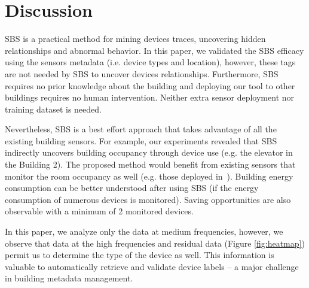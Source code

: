 \section{Discussion}
SBS is a practical method for mining devices traces, uncovering hidden relationships and abnormal behavior. 
In this paper, we validated the SBS efficacy using the sensors metadata (i.e. device types and location), however, these 
tags are not needed by SBS to uncover devices relationships.
Furthermore, SBS requires no prior knowledge about the building and deploying our tool to other buildings requires no human intervention.
Neither extra sensor deployment nor training dataset is needed. 

Nevertheless, SBS is a best effort approach that takes advantage of all the existing building sensors.
For example, our experiments revealed that SBS indirectly uncovers building occupancy through device use (e.g. the elevator in the Building 2). 
The proposed method would benefit from existing sensors that monitor the room occupancy as well (e.g. those deployed in~\cite{agarwal:ipsn2011,erickson:ipsn2011}).  %
Building energy consumption can be better understood after using SBS (if the energy consumption of numerous devices is monitored).  
Saving opportunities are also observable with a minimum of 2 monitored devices.

In this paper, we analyze only the data at medium frequencies, however, we observe that data at the high frequencies and residual data (Figure \ref{fig:heatmap}) permit us to determine the type of the  device as well.
This information is valuable to automatically retrieve and validate device labels -- a major challenge in building metadata
management.


% 
% 

